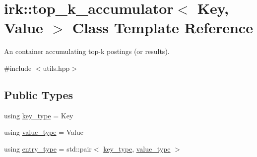 \hypertarget{classirk_1_1top__k__accumulator}{}\section{irk\+:\+:top\+\_\+k\+\_\+accumulator$<$ Key, Value $>$ Class Template Reference}
\label{classirk_1_1top__k__accumulator}


An container accumulating top-\/k postings (or results).  




{\ttfamily \#include $<$utils.\+hpp$>$}

\subsection*{Public Types}
\begin{DoxyCompactItemize}
\item 
using \mbox{\hyperlink{classirk_1_1top__k__accumulator_a2476f5b995fe252f092590c05f48e61f}{key\+\_\+type}} = Key
\item 
using \mbox{\hyperlink{classirk_1_1top__k__accumulator_ad96657e9478dcbab995f3bf38954b5bd}{value\+\_\+type}} = Value
\item 
using \mbox{\hyperlink{classirk_1_1top__k__accumulator_a0eacc4cbf280b54983e25b9d34bd91c0}{entry\+\_\+type}} = std\+::pair$<$ \mbox{\hyperlink{classirk_1_1top__k__accumulator_a2476f5b995fe252f092590c05f48e61f}{key\+\_\+type}}, \mbox{\hyperlink{classirk_1_1top__k__accumulator_ad96657e9478dcbab995f3bf38954b5bd}{value\+\_\+type}} $>$
\end{DoxyCompactItemize}
